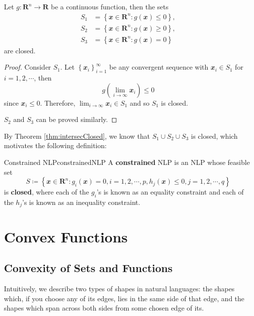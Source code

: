 \documentclass[math]{amznotes}
\theoremstyle{remark}
\begin{document}
\begin{thmbox}{}{}
    Let $g \colon \mathbf{R}^n \to \mathbf{R}$ be a continuous function, then the sets
    \begin{align*}
        S_1 & = \left\{\mathbfit{x} \in \mathbf{R}^n \colon g(\mathbfit{x}) \leq 0\right\}, \\
        S_2 & = \left\{\mathbfit{x} \in \mathbf{R}^n \colon g(\mathbfit{x}) \geq 0\right\}, \\
        S_3 & = \left\{\mathbfit{x} \in \mathbf{R}^n \colon g(\mathbfit{x}) = 0\right\}
    \end{align*}
    are closed.
    \tcblower
    \begin{proof}
        Consider $S_1$. Let $\left\{\mathbfit{x}_i\right\}_{i = 1}^\infty$ be any convergent sequence with $\mathbfit{x}_i \in S_1$ for $i = 1, 2, \cdots$, then
        \begin{equation*}
            g\left(\lim_{i \to \infty}\mathbfit{x}_i\right) \leq 0
        \end{equation*}
        since $\mathbfit{x}_i \leq 0$. Therefore, $\lim_{i \to \infty}\mathbfit{x}_i \in S_1$ and so $S_1$ is closed.

        $S_2$ and $S_3$ can be proved similarly.
    \end{proof}
\end{thmbox}
By Theorem \ref{thm:intersecClosed}, we know that $S_1 \cup S_2 \cup S_3$ is closed, which motivates the following definition:
\begin{dfnbox}{Constrained NLP}{constrainedNLP}
    A {\color{red} \textbf{constrained}} NLP is an NLP whose feasible set
    \begin{displaymath}
        S \coloneqq \left\{\mathbfit{x} \in \mathbf{R}^n \colon g_i(\mathbfit{x}) = 0, i = 1, 2, \cdots, p, h_j(\mathbfit{x}) \leq 0, j = 1, 2, \cdots, q\right\}
    \end{displaymath}
    is {\color{red} \textbf{closed}}, where each of the $g_i$'s is known as an equality constraint and each of the $h_j$'s is known as an inequality constraint.
\end{dfnbox}

\chapter{Convex Functions}
\section{Convexity of Sets and Functions}
Intuitively, we describe two types of shapes in natural languages: the shapes which, if you choose any of its edges, lies in the same side of that edge, and the shapes which span across both sides from some chosen edge of its.
\end{document}
